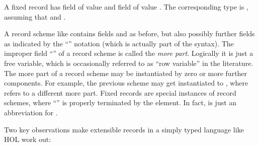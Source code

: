 \begin{isabellebody}
\begin{isamarkuptext}
  A fixed record  has field  of value
   and field  of value .  The corresponding
  type is , assuming that 
  and .

  A record scheme like  contains fields
   and  as before, but also possibly further fields
  as indicated by the ``\isa{{\isachardoublequote}{\isasymdots}{\isachardoublequote}}'' notation (which is actually part
  of the syntax).  The improper field ``\isa{{\isachardoublequote}{\isasymdots}{\isachardoublequote}}'' of a record
  scheme is called the \emph{more part}.  Logically it is just a free
  variable, which is occasionally referred to as ``row variable'' in
  the literature.  The more part of a record scheme may be
  instantiated by zero or more further components.  For example, the
  previous scheme may get instantiated to , where  refers to a different more part.
  Fixed records are special instances of record schemes, where
  ``\isa{{\isachardoublequote}{\isasymdots}{\isachardoublequote}}'' is properly terminated by the 
  element.  In fact,  is just an abbreviation
  for .
  
  \medskip Two key observations make extensible records in a simply
  typed language like HOL work out:


\end{isamarkuptext}
\end{isabellebody}
